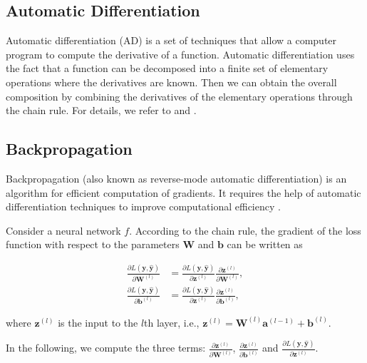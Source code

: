 \documentclass[
	parskip, 			   %
	twoside, 			   %
	DIV=14, 			   %
	BCOR=15.0mm, 		   %
	headsepline, 		   %
	open=right, 		   %
	captions=tableheading, %
	bibliography=totoc,    %
	numbers=noenddot       %
]{scrreprt}
\begin{document}
\subsection{Automatic Differentiation}
Automatic differentiation (AD) is a set of techniques that allow a computer program to compute the derivative of a function. Automatic differentiation uses the fact that a function can be decomposed into a finite set of elementary operations where the derivatives are known. Then we can obtain the overall composition by combining the derivatives of the elementary operations through the chain rule. For details, we refer to \cite{baydin2018automatic} and \cite{margossian2019review}.

\subsection{Backpropagation}
Backpropagation (also known as reverse-mode automatic differentiation) is an algorithm for efficient computation of gradients. It requires the help of automatic differentiation techniques to improve computational efficiency \cite{baydin2018automatic}.

Consider a neural network $f$. According to the chain rule, the gradient of the loss function with respect to the parameters $\mathbf{W}$ and $\mathbf{b}$ can be written as

\begin{equation}
    \label{eq:Chain_rule_partial}
    \begin{aligned}
        \frac{\partial L\left( \mathbf{y}, \hat{\mathbf{y}} \right)}{\partial \mathbf{W}^{(l)}} &= \frac{\partial L \left( \mathbf{y}, \hat{\mathbf{y}} \right)}{\partial \mathbf{z}^{(l)}} 
        \frac{\partial \mathbf{z}^{(l)}}{\partial \mathbf{W}^{(l)}},
        \\
        \frac{\partial L\left( \mathbf{y}, \hat{\mathbf{y}} \right)}{\partial \mathbf{b}^{(l)}} &= \frac{\partial L \left( \mathbf{y}, \hat{\mathbf{y}} \right)}{\partial \mathbf{z}^{(l)}} 
        \frac{\partial \mathbf{z}^{(l)}}{\partial \mathbf{b}^{(l)}},
    \end{aligned}
\end{equation}

where $\mathbf{z}^{(l)}$ is the input to the $l$th layer, i.e., $\mathbf{z}^{(l)} = \mathbf{W}^{(l)} \mathbf{a}^{(l-1)} + \mathbf{b}^{(l)}$. 

In the following, we compute the three terms: $\frac{\partial \mathbf{z}^{(l)}}{\partial \mathbf{W}^{(l)}}$, $\frac{\partial \mathbf{z}^{(l)}}{\partial \mathbf{b}^{(l)}}$ and $\frac{\partial L \left( \mathbf{y}, \hat{\mathbf{y}} \right)}{\partial \mathbf{z}^{(l)}}$.
\end{document}
